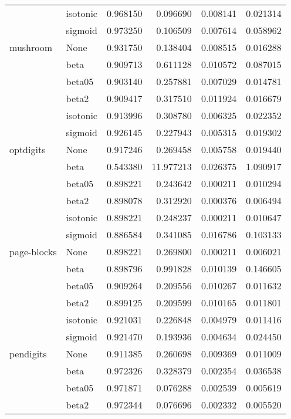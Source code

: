 \begin{tabular}{llrrrr}
        & isotonic &  0.968150 &   0.096690 &  0.008141 &  0.021314 \\
        & sigmoid &  0.973250 &   0.106509 &  0.007614 &  0.058962 \\
mushroom & None &  0.931750 &   0.138404 &  0.008515 &  0.016288 \\
        & beta &  0.909713 &   0.611128 &  0.010572 &  0.087015 \\
        & beta05 &  0.903140 &   0.257881 &  0.007029 &  0.014781 \\
        & beta2 &  0.909417 &   0.317510 &  0.011924 &  0.016679 \\
        & isotonic &  0.913996 &   0.308780 &  0.006325 &  0.022352 \\
        & sigmoid &  0.926145 &   0.227943 &  0.005315 &  0.019302 \\
optdigits & None &  0.917246 &   0.269458 &  0.005758 &  0.019440 \\
        & beta &  0.543380 &  11.977213 &  0.026375 &  1.090917 \\
        & beta05 &  0.898221 &   0.243642 &  0.000211 &  0.010294 \\
        & beta2 &  0.898078 &   0.312920 &  0.000376 &  0.006494 \\
        & isotonic &  0.898221 &   0.248237 &  0.000211 &  0.010647 \\
        & sigmoid &  0.886584 &   0.341085 &  0.016786 &  0.103133 \\
page-blocks & None &  0.898221 &   0.269800 &  0.000211 &  0.006021 \\
        & beta &  0.898796 &   0.991828 &  0.010139 &  0.146605 \\
        & beta05 &  0.909264 &   0.209556 &  0.010267 &  0.011632 \\
        & beta2 &  0.899125 &   0.209599 &  0.010165 &  0.011801 \\
        & isotonic &  0.921031 &   0.226848 &  0.004979 &  0.011416 \\
        & sigmoid &  0.921470 &   0.193936 &  0.004634 &  0.024450 \\
pendigits & None &  0.911385 &   0.260698 &  0.009369 &  0.011009 \\
        & beta &  0.972326 &   0.328379 &  0.002354 &  0.036538 \\
        & beta05 &  0.971871 &   0.076288 &  0.002539 &  0.005619 \\
        & beta2 &  0.972344 &   0.076696 &  0.002332 &  0.005520 \\

\end{tabular}

